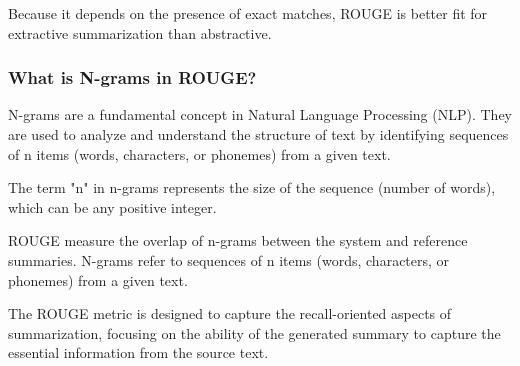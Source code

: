 Because it depends on the presence of exact matches, ROUGE is better fit for extractive summarization than abstractive.

\subsubsection{What is N-grams in ROUGE?}
\begin{bulletedlist}
	\item N-grams are a fundamental concept in Natural Language Processing (NLP). They are used to analyze and understand the structure of text by identifying sequences of n items (words, characters, or phonemes) from a given text.
	\item The term "n" in n-grams represents the size of the sequence (number of words), which can be any positive integer.
	\item ROUGE measure the overlap of n-grams between the system and reference summaries. N-grams refer to sequences of n items (words, characters, or phonemes) from a given text.
	\item The ROUGE metric is designed to capture the recall-oriented aspects of summarization, focusing on the ability of the generated summary to capture the essential information from the source text.
\end{bulletedlist}

